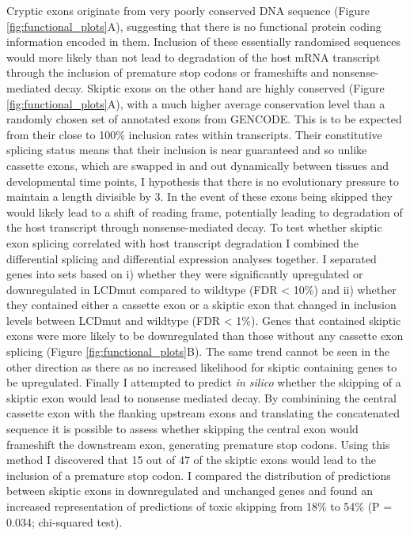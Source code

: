 Cryptic exons originate from very poorly conserved DNA sequence  (Figure \ref{fig:functional_plots}A), suggesting that there is no functional protein coding information encoded in them. 
Inclusion of these essentially randomised sequences would more likely than not lead to degradation of the host mRNA transcript through the inclusion of premature stop codons or frameshifts and nonsense-mediated decay. 
Skiptic exons on the other hand are highly conserved (Figure \ref{fig:functional_plots}A), with a much higher average conservation level than a randomly chosen set of annotated exons from GENCODE.  
This is to be expected from their close to 100\% inclusion rates within transcripts. 
Their constitutive splicing status means that their inclusion is near guaranteed and so unlike cassette exons, which are swapped in and out dynamically between tissues and developmental time points, I hypothesis that there is no evolutionary pressure to maintain a length divisible by 3. 
In the event of these exons being skipped they would likely lead to a shift of reading frame, potentially leading to degradation of the host transcript through nonsense-mediated decay.
 To test whether skiptic exon splicing correlated with host transcript degradation I combined the differential splicing and differential expression analyses together. I separated genes into sets based on i) whether they were significantly upregulated or downregulated in LCDmut compared to wildtype (FDR < 10\%) and ii) whether they contained either a cassette exon or a skiptic exon that changed in inclusion levels between LCDmut and wildtype (FDR < 1\%). Genes that contained skiptic exons were more likely to be downregulated than those without any cassette exon splicing  (Figure \ref{fig:functional_plots}B). The same trend cannot be seen in the other direction as there as no increased likelihood for skiptic containing genes to be upregulated. 
 Finally I attempted to predict \textit{in silico} whether the skipping of a skiptic exon would lead to nonsense mediated decay. 
 By combinining the central cassette exon with the flanking upstream exons and translating the concatenated sequence it is possible to assess whether skipping the central exon would frameshift the downstream exon, generating premature stop codons. 
 Using this method I discovered that 15 out of 47 of the skiptic exons would lead to the inclusion of a premature stop codon.  
I compared the distribution of predictions between skiptic exons in downregulated and unchanged genes and found an increased representation of predictions of toxic skipping from 18\% to 54\% (P = 0.034; chi-squared test). 

